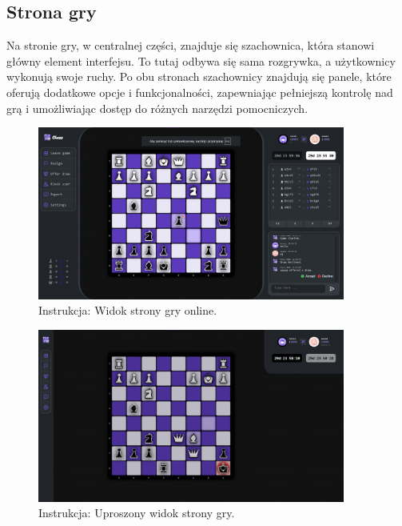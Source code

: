 \documentclass[12pt,a4paper]{article}
\begin{document}
\newpage

\subsection{Strona gry}

Na stronie gry, w centralnej części, znajduje się szachownica, która stanowi główny element interfejsu. To tutaj odbywa się sama rozgrywka, a użytkownicy wykonują swoje ruchy. Po obu stronach szachownicy znajdują się panele, które oferują dodatkowe opcje i funkcjonalności, zapewniając pełniejszą kontrolę nad grą i umożliwiając dostęp do różnych narzędzi pomocniczych.

\vspace{1cm}
\begin{figure}[h!]
    \centering
    \includegraphics[width=0.9\textwidth]{images/ins_webgame.png}
    \caption{Instrukcja: Widok strony gry online.}
\end{figure}

\begin{figure}[h!]
    \centering
    \includegraphics[width=0.9\textwidth]{images/ins_simpgame.png}
    \caption{Instrukcja: Uproszony widok strony gry.}
\end{figure}
\end{document}
